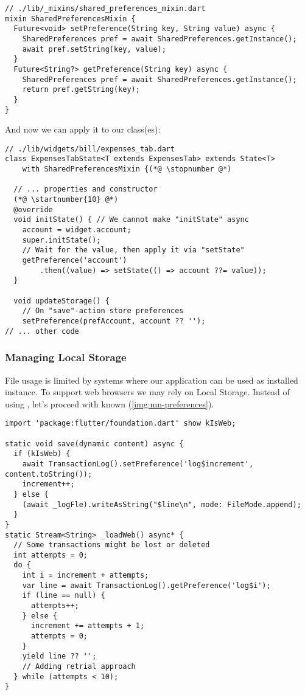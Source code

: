 \begin{lstlisting}
// ./lib/_mixins/shared_preferences_mixin.dart
mixin SharedPreferencesMixin {
  Future<void> setPreference(String key, String value) async {
    SharedPreferences pref = await SharedPreferences.getInstance();
    await pref.setString(key, value);
  }
  Future<String?> getPreference(String key) async {
    SharedPreferences pref = await SharedPreferences.getInstance();
    return pref.getString(key);
  }
}
\end{lstlisting}

\noindent And now we can apply it to our class(es):

\begin{lstlisting}
// ./lib/widgets/bill/expenses_tab.dart
class ExpensesTabState<T extends ExpensesTab> extends State<T>
    with SharedPreferencesMixin {(*@ \stopnumber @*)

  // ... properties and constructor
  (*@ \startnumber{10} @*)
  @override
  void initState() { // We cannot make "initState" async
    account = widget.account;
    super.initState();
    // Wait for the value, then apply it via "setState"
    getPreference('account')
        .then((value) => setState(() => account ??= value));
  }

  void updateStorage() {
    // On "save"-action store preferences
    setPreference(prefAccount, account ?? '');
// ... other code
\end{lstlisting}


\subsubsection{Managing Local Storage}

File usage is limited by systems where our application can be used as installed instance. To support web browsers
we may rely on Local Storage. Instead of using , let's proceed with known  
(\cref{img:mn-preferences}).

\begin{lstlisting}
import 'package:flutter/foundation.dart' show kIsWeb;

static void save(dynamic content) async {
  if (kIsWeb) {
    await TransactionLog().setPreference('log$increment', content.toString());
    increment++;
  } else {
    (await _logFle).writeAsString("$line\n", mode: FileMode.append);
  }
}
static Stream<String> _loadWeb() async* {
  // Some transactions might be lost or deleted
  int attempts = 0;
  do {
    int i = increment + attempts;
    var line = await TransactionLog().getPreference('log$i');
    if (line == null) {
      attempts++;
    } else {
      increment += attempts + 1;
      attempts = 0;
    }
    yield line ?? '';
    // Adding retrial approach
  } while (attempts < 10);
}
\end{lstlisting}

